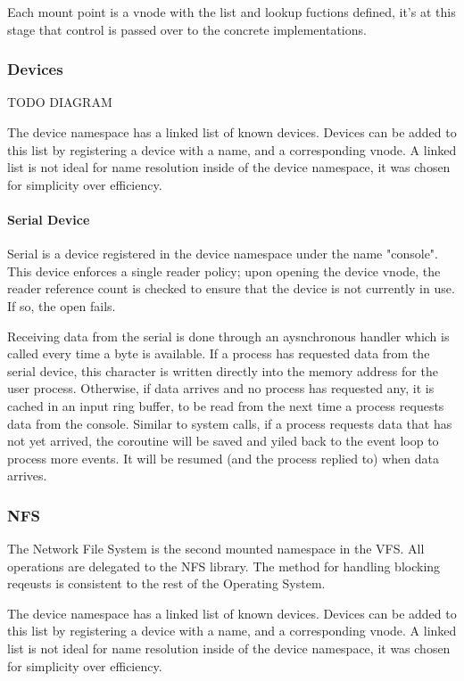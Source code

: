 \documentclass[runningheads,a4paper]{llncs}
\begin{document}
Each mount point is a vnode with the list and lookup fuctions defined, it's at this stage that control is passed over to the concrete implementations.

\subsubsection{Devices}

TODO DIAGRAM

The device namespace has a linked list of known devices. Devices can be added to this list by registering a device with a name, and a corresponding vnode. A linked list is not ideal for name resolution inside of the device namespace, it was chosen for simplicity over efficiency.

\paragraph{Serial Device}

Serial is a device registered in the device namespace under the name "console". This device enforces a single reader policy; upon opening the device vnode, the reader reference count is checked to ensure that the device is not currently in use. If so, the open fails.

Receiving data from the serial is done through an aysnchronous handler which is called every time a byte is available. If a process has requested data from the serial device, this character is written directly into the memory address for the user process. Otherwise, if data arrives and no process has requested any, it is cached in an input ring buffer, to be read from the next time a process requests data from the console. Similar to system calls, if a process requests data that has not yet arrived, the coroutine will be saved and yiled back to the event loop to process more events. It will be resumed (and the process replied to) when data arrives.

\subsubsection{NFS}
 
The Network File System is the second mounted namespace in the VFS. All operations are delegated to the NFS library. The method for handling blocking reqeusts is consistent to the rest of the Operating System. 


The device namespace has a linked list of known devices. Devices can be added to this list by registering a device with a name, and a corresponding vnode. A linked list is not ideal for name resolution inside of the device namespace, it was chosen for simplicity over efficiency.
\end{document}
